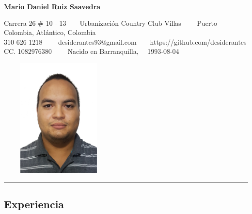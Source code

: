 \documentclass[10pt,a4paper]{article}
\begin{document}
\begin{center}
{\LARGE \textbf{Mario Daniel Ruiz Saavedra}}

Carrera 26 \# 10 - 13\ \ 
\ \ Urbanización Country Club Villas\ \ \textbullet
\ \ Puerto Colombia, Atlántico, Colombia
\\
310 626 1218\ \ \textbullet
\ \ desiderantes93@gmail.com\ \ \textbullet \ \ https://github.com/desiderantes
\\
CC. 1082976380 \ \ \textbullet \ \ Nacido en Barranquilla, \ \ 1993-08-04


\vspace{0.4em}
\includegraphics [width=6cm,height=6cm,keepaspectratio]{Foto.jpg}
\end{center}
\hrule
\vspace{-0.4em}
\subsection*{Experiencia}
\end{document}
